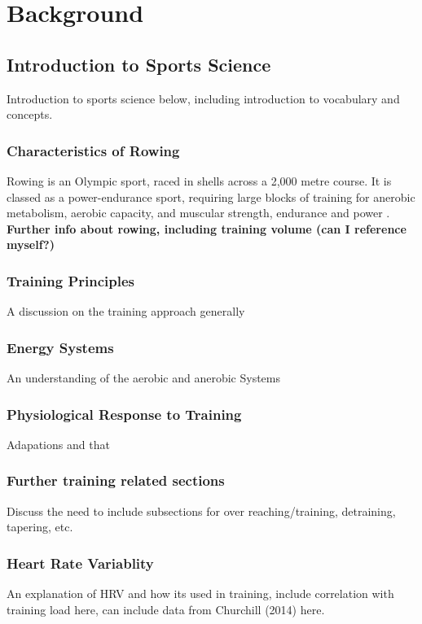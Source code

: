 \chapter{Background}
\label{Chapt2}

\section{Introduction to Sports Science}
Introduction to sports science below, including introduction to vocabulary and concepts.

\subsection{Characteristics of Rowing}
Rowing is an Olympic sport, raced in shells across a 2,000 metre course. It is classed as a power-endurance sport, requiring large blocks of training for anerobic metabolism, aerobic capacity, and muscular strength, endurance and power \cite{S2002}. \textbf{Further info about rowing, including training volume (can I reference myself?)} 

\subsection{Training Principles}
A discussion on the training approach generally

\subsection{Energy Systems}
An understanding of the aerobic and anerobic Systems

\subsection{Physiological Response to Training}
Adapations and that

\subsection{Further training related sections}
Discuss the need to include subsections for over reaching/training, detraining, tapering, etc.

\subsection{Heart Rate Variablity}
An explanation of HRV and how its used in training, include correlation with training load here, can include data from Churchill (2014) \cite{Churchill2014} here.

